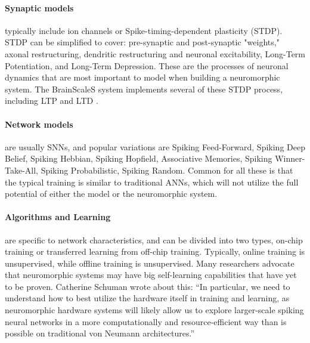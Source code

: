 \paragraph{Synaptic models} typically include ion channels or Spike-timing-dependent plasticity (STDP).
STDP can be simplified to cover: pre-synaptic and post-synaptic "weights," axonal restructuring, dendritic restructuring and neuronal excitability, Long-Term Potentiation, and Long-Term Depression.
These are the processes of neuronal dynamics that are most important to model when building a neuromorphic system.
The BrainScaleS system implements several of these STDP process, including LTP and LTD \cite{meier_mixed-signal_2015}\cite{schemmel_implementing_2006}.
\cite{schuman_survey_2017}

\paragraph{Network models} are usually SNNs, and popular variations are Spiking Feed-Forward, Spiking Deep Belief, Spiking Hebbian, Spiking Hopfield, Associative Memories, Spiking Winner-Take-All, Spiking Probabilistic, Spiking Random. Common for all these is that the typical training is similar to traditional ANNs, which will not utilize the full potential of either the model or the neuromorphic system.
\cite{schuman_survey_2017}

\paragraph{Algorithms and Learning} are specific to network characteristics, and can be divided into two types, on-chip training or transferred learning from off-chip training.
Typically, online training is unsupervised, while offline training is unsupervised.
    Many researchers advocate that neuromorphic systems may have big self-learning capabilities that have yet to be proven. Catherine Schuman wrote about this: ``In particular, we need to understand how to best utilize the hardware itself in training and learning, as neuromorphic hardware systems will likely allow us to explore larger-scale spiking neural networks in a more computationally and resource-efficient way than is possible on traditional von Neumann architectures.''
\cite{schuman_survey_2017}

